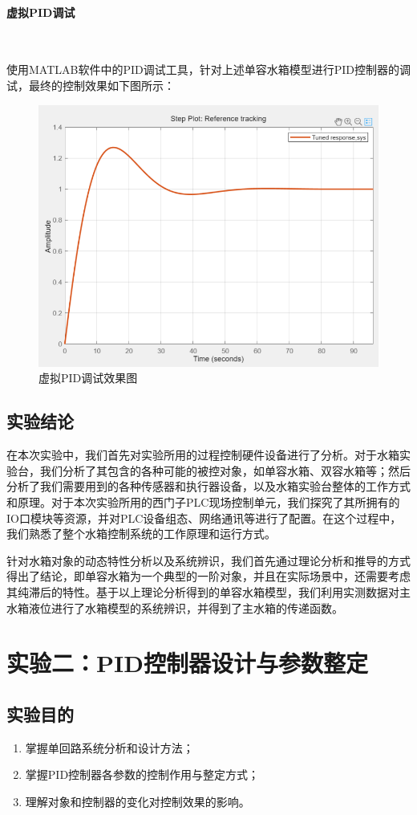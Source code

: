 \documentclass[UTF8]{article}
\begin{document}
\paragraph{虚拟PID调试}~{}

使用MATLAB软件中的PID调试工具，针对上述单容水箱模型进行PID控制器的调试，最终的控制效果如下图所示：
\begin{figure}[H]
    \centering %
    \includegraphics[width=.6\textwidth]{figure/水箱辨识-虚拟pid调试.png} 
    \caption{虚拟PID调试效果图} %
\end{figure}

\subsection{实验结论}

在本次实验中，我们首先对实验所用的过程控制硬件设备进行了分析。对于水箱实验台，我们分析了其包含的各种可能的被控对象，如单容水箱、双容水箱等；然后分析了我们需要用到的各种传感器和执行器设备，以及水箱实验台整体的工作方式和原理。对于本次实验所用的西门子PLC现场控制单元，我们探究了其所拥有的IO口模块等资源，并对PLC设备组态、网络通讯等进行了配置。在这个过程中，我们熟悉了整个水箱控制系统的工作原理和运行方式。

针对水箱对象的动态特性分析以及系统辨识，我们首先通过理论分析和推导的方式得出了结论，即单容水箱为一个典型的一阶对象，并且在实际场景中，还需要考虑其纯滞后的特性。基于以上理论分析得到的单容水箱模型，我们利用实测数据对主水箱液位进行了水箱模型的系统辨识，并得到了主水箱的传递函数。



\newpage
%
\section{实验二：PID控制器设计与参数整定}
\subsection{实验目的}
\begin{enumerate}
	\item 掌握单回路系统分析和设计方法；
	\item 掌握PID控制器各参数的控制作用与整定方式；
	\item 理解对象和控制器的变化对控制效果的影响。
\end{enumerate}
\end{document}
